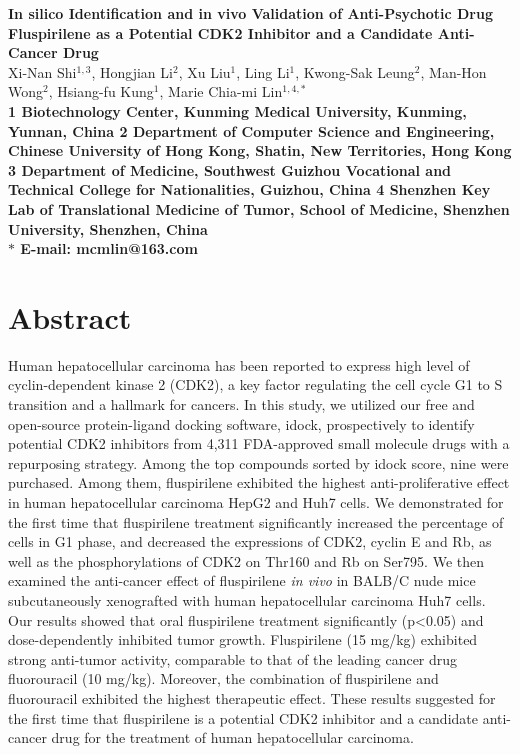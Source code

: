\documentclass[10pt]{article}
\date{}
\begin{document}
\begin{flushleft}
{\Large
\textbf{In silico Identification and in vivo Validation of Anti-Psychotic Drug Fluspirilene as a Potential CDK2 Inhibitor and a Candidate Anti-Cancer Drug}
}
\\
Xi-Nan Shi$^{1,3}$,
Hongjian Li$^{2}$,
Xu Liu$^{1}$,
Ling Li$^{1}$,
Kwong-Sak Leung$^{2}$,
Man-Hon Wong$^{2}$,
Hsiang-fu Kung$^{1}$,
Marie Chia-mi Lin$^{1,4,\ast}$
\\
\bf{1} Biotechnology Center, Kunming Medical University, Kunming, Yunnan, China
\bf{2} Department of Computer Science and Engineering, Chinese University of Hong Kong, Shatin, New Territories, Hong Kong
\bf{3} Department of Medicine, Southwest Guizhou Vocational and Technical College for Nationalities, Guizhou, China
\bf{4} Shenzhen Key Lab of Translational Medicine of Tumor, School of Medicine, Shenzhen University, Shenzhen, China
\\
$\ast$ E-mail: mcmlin@163.com
\end{flushleft}

\section*{Abstract}
Human hepatocellular carcinoma has been reported to express high level of cyclin-dependent kinase 2 (CDK2), a key factor regulating the cell cycle G1 to S transition and a hallmark for cancers. In this study, we utilized our free and open-source protein-ligand docking software, idock, prospectively to identify potential CDK2 inhibitors from 4,311 FDA-approved small molecule drugs with a repurposing strategy. Among the top compounds sorted by idock score, nine were purchased. Among them, fluspirilene exhibited the highest anti-proliferative effect in human hepatocellular carcinoma HepG2 and Huh7 cells. We demonstrated for the first time that fluspirilene treatment significantly increased the percentage of cells in G1 phase, and decreased the expressions of CDK2, cyclin E and Rb, as well as the phosphorylations of CDK2 on Thr160 and Rb on Ser795. We then examined the anti-cancer effect of fluspirilene \textit{in vivo} in BALB/C nude mice subcutaneously xenografted with human hepatocellular carcinoma Huh7 cells. Our results showed that oral fluspirilene treatment significantly (p<0.05) and dose-dependently inhibited tumor growth. Fluspirilene (15 mg/kg) exhibited strong anti-tumor activity, comparable to that of the leading cancer drug fluorouracil (10 mg/kg). Moreover, the combination of fluspirilene and fluorouracil exhibited the highest therapeutic effect. These results suggested for the first time that fluspirilene is a potential CDK2 inhibitor and a candidate anti-cancer drug for the treatment of human hepatocellular carcinoma.
\end{document}
